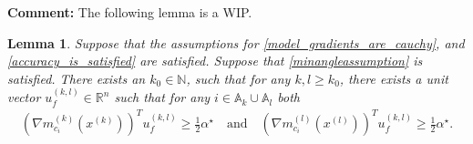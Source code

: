 \documentclass{article}
\newenvironment{comment}
  {\par\medskip
   \color{red}%
   \begin{framed}
   \textbf{Comment: }\ignorespaces}
 {\end{framed}
  \medskip}
\newtheorem{lemma}[theorem]{Lemma}
\theoremstyle{case}
\numberwithin{theorem}{subsection}
\newcommand{\activeconstraintsk}{{\mathbb A_{k}}}
\newcommand{\activeconstraintsl}{{\mathbb A_{l}}}
\newcommand{\gmcik}{{\nabla m_{c_i}^{(k)}\left(\xk\right)}}
\newcommand{\gmcil}{{\nabla m_{c_i}^{(l)}\left(\xl\right)}}
\newcommand{\minanglealpha}{{ \alpha^{\star} }}
\newcommand{\naturals}{\mathbb N}
\newcommand{\Rn}{\mathbb R^n}
\newcommand{\xk}{{x^{(k)}}}
\newcommand{\xl}{{x^{(l)}}}
\begin{document}
\begin{comment}
The following lemma is a WIP.
\end{comment}

\begin{lemma}
Suppose that the assumptions for \cref{model_gradients_are_cauchy}, and \cref{accuracy_is_satisfied} are satisfied.
Suppose that \cref{minangleassumption} is satisfied.
There exists an $k_0 \in \naturals$, such that for any $k, l \ge k_0$, there exists a unit vector $u_f^{(k,l)} \in \Rn$ such that for any $i \in \activeconstraintsk \cup \activeconstraintsl$
both 
\begin{align*}
\left(\gmcik\right)^T u_f^{(k,l)} \ge \frac 1 2 \minanglealpha
\quad \textrm{and} \quad
\left(\gmcil\right)^T u_f^{(k,l)} \ge \frac 1 2 \minanglealpha.
\end{align*}
\end{lemma}
\end{document}
